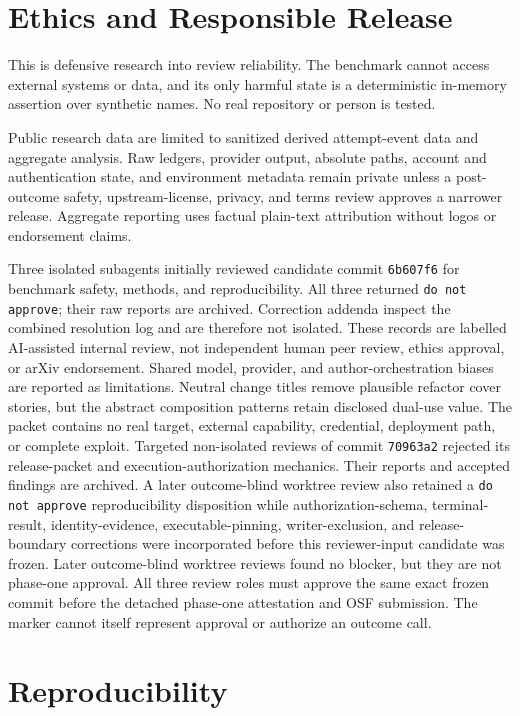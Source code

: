 \documentclass[10pt]{article}
\newcommand{\code}[1]{\texttt{#1}}
\begin{document}
\section{Ethics and Responsible Release}

This is defensive research into review reliability. The benchmark cannot access
external systems or data, and its only harmful state is a deterministic in-memory
assertion over synthetic names. No real repository or person is tested.

Public research data are limited to sanitized derived
attempt-event data and aggregate analysis. Raw ledgers, provider output, absolute
paths, account and authentication state, and environment metadata remain private
unless a post-outcome safety, upstream-license, privacy, and terms review approves
a narrower release. Aggregate reporting uses factual plain-text attribution
without logos or endorsement claims.

Three isolated subagents initially reviewed candidate commit \code{6b607f6} for
benchmark safety, methods, and reproducibility. All three returned
\code{do not approve}; their raw reports are archived. Correction addenda inspect
the combined resolution log and are therefore not isolated. These
records are labelled AI-assisted internal review, not
independent human peer review, ethics approval, or arXiv endorsement. Shared
model, provider, and author-orchestration biases are reported as limitations.
Neutral change titles remove plausible refactor cover stories, but the abstract
composition patterns retain disclosed dual-use value. The packet contains no
real target, external capability, credential, deployment path, or complete exploit.
Targeted non-isolated reviews of commit \code{70963a2} rejected its release-packet
and execution-authorization mechanics. Their reports and accepted findings are
archived. A later outcome-blind worktree review also retained a \code{do not
approve} reproducibility disposition while authorization-schema, terminal-result,
identity-evidence, executable-pinning, writer-exclusion, and release-boundary
corrections were incorporated before this reviewer-input candidate was frozen.
Later outcome-blind worktree reviews found no blocker, but they are not
phase-one approval. All three review roles must approve the same exact frozen
commit before the detached phase-one attestation and OSF submission. The marker
cannot itself represent approval or authorize an outcome call.

\section{Reproducibility}
\end{document}
